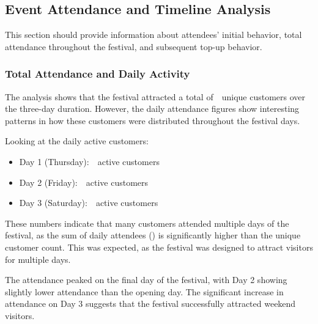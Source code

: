 
\subsection{Event Attendance and Timeline Analysis}
\label{subsec:analysis-customer-event-attendance-timeline}

This section should provide information about attendees' initial behavior, total attendance throughout the festival, and subsequent top-up behavior.


\subsubsection{Total Attendance and Daily Activity}
\label{subsubsec:analysis-total-attendance}

\begin{rqbox}
	\textit{}
\end{rqbox}

The analysis shows that the festival attracted a total of~~unique customers over the three-day duration.
However, the daily attendance figures show interesting patterns in how these customers were distributed throughout the festival days.

Looking at the daily active customers:
\begin{itemize}
	\item Day 1 (Thursday):~~active customers
	\item Day 2 (Friday):~~active customers
	\item Day 3 (Saturday):~~active customers
\end{itemize}

These numbers indicate that many customers attended multiple days of the festival, as the sum of daily attendees () is significantly higher than the unique customer count.
This was expected, as the festival was designed to attract visitors for multiple days.

The attendance peaked on the final day of the festival, with Day 2 showing slightly lower attendance than the opening day.
The significant increase in attendance on Day 3 suggests that the festival successfully attracted weekend visitors.


